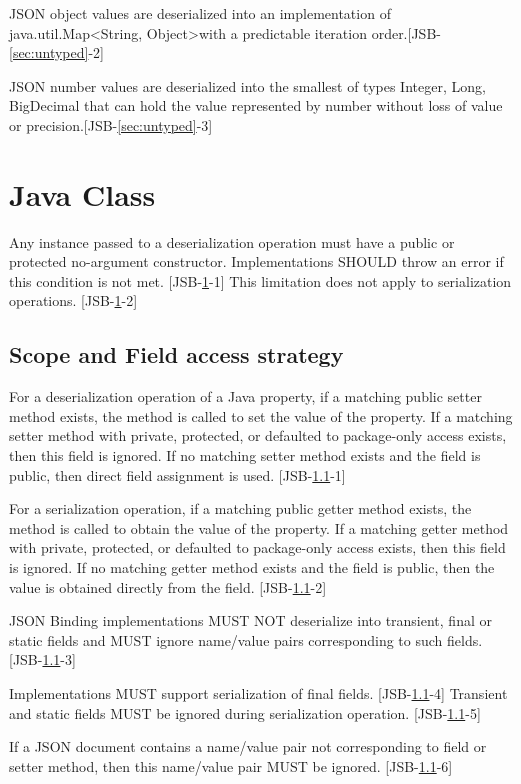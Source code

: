 JSON object values are deserialized into an implementation of java.util.Map\textless String, Object\textgreater\space with a predictable iteration order.[JSB-\ref{sec:untyped}-2]

JSON number values are deserialized into the smallest of types Integer, Long, BigDecimal that can hold the value represented by number without loss of value or precision.[JSB-\ref{sec:untyped}-3]

\section{Java Class}
\label{sec:class}
Any instance passed to a deserialization operation must have a public or protected no-argument constructor. Implementations SHOULD throw an error if this condition is not met. [JSB-\ref{sec:class}-1] This limitation does not apply to serialization operations. [JSB-\ref{sec:class}-2]

\subsection{Scope and Field access strategy}
\label{subsec:fieldstrategy}
For a deserialization operation of a Java property, if a matching public setter method exists, the method is called to set the value of the property. 
If a matching setter method with private, protected, or defaulted to package-only access exists, then this field is ignored. 
If no matching setter method exists and the field is public, then direct field assignment is used. [JSB-\ref{subsec:fieldstrategy}-1]

For a serialization operation, if a matching public getter method exists, the method is called to obtain the value of the property. 
If a matching getter method with private, protected, or defaulted to package-only access exists, then this field is ignored. 
If no matching getter method exists and the field is public, then the value is obtained directly from the field. [JSB-\ref{subsec:fieldstrategy}-2]

JSON Binding implementations MUST NOT deserialize into transient, final or static fields and MUST ignore name/value pairs corresponding to such fields. [JSB-\ref{subsec:fieldstrategy}-3]

Implementations MUST support serialization of final fields. [JSB-\ref{subsec:fieldstrategy}-4] Transient and static fields MUST be ignored during serialization operation. [JSB-\ref{subsec:fieldstrategy}-5]

If a JSON document contains a name/value pair not corresponding to field or setter method, then this name/value pair MUST be ignored. [JSB-\ref{subsec:fieldstrategy}-6]

